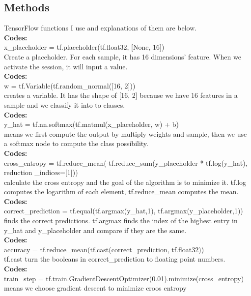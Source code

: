 \documentclass{article}
\begin{document}
\subsection{Methods}
TensorFlow functions I use and explanations of them are below.\\

\textbf{Codes:}
\\x\_placeholder = tf.placeholder(tf.float32, [None, 16]) 
\\Create a placeholder. For each sample, it has 16 dimensions' feature. When we activate the session, it will input a value.\\

\textbf{Codes:}
\\w = tf.Variable(tf.random\_normal([16, 2])) 
\\creates a variable. It has the shape of [16, 2] because we have 16 features in a sample and we classify it into to classes.
\\\textbf{Codes:}
\\y\_hat = tf.nn.softmax(tf.matmul(x\_placeholder, w) + b) 
\\means we first compute the output by multiply weights and sample, then we use a softmax node to compute the class possibility.
\\\textbf{Codes:}
\\cross\_entropy = tf.reduce\_mean(-tf.reduce\_sum(y\_placeholder * tf.log(y\_hat), reduction
\_indices=[1])) 
\\calculate the cross entropy and the goal of the algorithm is to minimize it. tf.log computes the logarithm of each element, tf.reduce\_mean computes the mean.
\\\textbf{Codes:}
\\correct\_prediction = tf.equal(tf.argmax(y\_hat,1), tf.argmax(y\_placeholder,1)) 
\\finds the correct predictions. tf.argmax finds the index of the highest entry in y\_hat and y\_placeholder and compare if they are the same.
\\\textbf{Codes:}
\\accuracy = tf.reduce\_mean(tf.cast(correct\_prediction, tf.float32)) 
\\tf.cast turn the booleans in correct\_prediction to floating point numbers.\\
\textbf{Codes:}
\\train\_step = tf.train.GradientDescentOptimizer(0.01).minimize(cross\_entropy) 
\\means we choose gradient descent to minimize croos entropy
\end{document}
